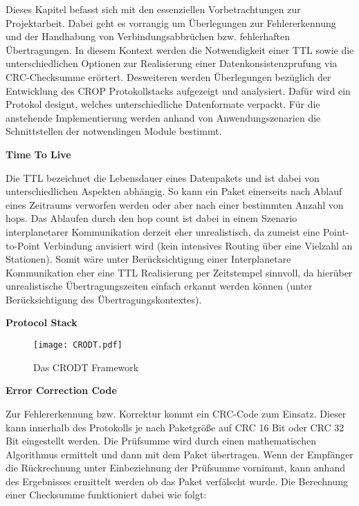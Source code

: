 
Dieses Kapitel befasst sich mit den essenziellen Vorbetrachtungen zur
Projektarbeit. Dabei geht es vorrangig um {\"U}berlegungen zur Fehlererkennung
und der Handhabung von Verbindungsabbr{\"u}chen bzw. fehlerhaften
{\"U}bertragungen. In diesem Kontext werden die Notwendigkeit einer TTL sowie
die unterschiedlichen Optionen zur Realisierung einer Datenkonsistenzpr{u}fung
via CRC-Checksumme er{\"o}rtert. Desweiteren werden {\"U}berlegungen
bez{\"u}glich der Entwicklung des CROP Protokollstacks aufgezeigt und
analysiert. Dafür wird ein Protokol designt, welches unterschiedliche
Datenformate  verpackt. Für die
anstehende Implementierung werden anhand von Anwendungszenarien die
Schnittstellen der notwendingen Module bestimmt.

\textbf{Time To Live}

Die TTL bezeichnet die Lebensdauer eines Datenpakets und ist dabei von
unterschiedlichen Aspekten abh{\"a}ngig. So kann ein Paket einerseits nach
Ablauf eines Zeitraums verworfen werden oder aber nach einer bestimmten Anzahl
von hops. Das Ablaufen durch den hop count ist dabei in einem Szenario
interplanetarer Kommunikation derzeit eher unrealistisch, da zumeist eine
Point-to-Point Verbindung anvisiert wird (kein intensives Routing {\"u}ber eine
Vielzahl an Stationen). Somit w{\"a}re unter Ber{\"u}cksichtigung einer
Interplanetare Kommunikation eher eine TTL Realisierung per Zeitstempel
sinnvoll, da hier{\"u}ber unrealistische {\"U}bertragungszeiten einfach erkannt
werden k{\"o}nnen (unter Ber{\"u}cksichtigung des {\"U}bertragungskontextes).

\textbf{Protocol Stack}

\begin{figure}[H]
\centering
\texttt{[image: CRODT.pdf]}
\caption{Das CRODT Framework}
\label{fig:CRODT}
\end{figure}

\textbf{Error Correction Code}

Zur Fehlererkennung bzw. Korrektur kommt ein CRC-Code zum Einsatz. Dieser kann
innerhalb des Protokolls je nach Paketgr{\"o}{\ss}e auf CRC 16 Bit oder CRC 32
Bit eingestellt werden. Die Pr{\"u}fsumme wird durch einen mathematischen
Algorithmus ermittelt und dann mit dem Paket {\"u}bertragen. Wenn der
Empf{\"a}nger die R{\"u}ckrechnung unter Einbeziehnung der Pr{\"u}fsumme
vornimmt, kann anhand des Ergebnisses ermittelt werden ob das Paket
verf{\"a}lscht wurde. Die Berechnung einer Checksumme funktioniert dabei wie
folgt:

